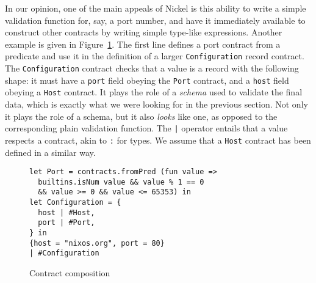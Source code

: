 \documentclass[sigplan,10pt,review,anonymous]{acmart}
\newcommand{\unsure}[2][1=]{}
\begin{document}
In our opinion, one of the main appeals of Nickel is this ability to write a
simple validation function for, say, a port number, and have it immediately
available to construct other contracts by writing simple type-like expressions.
Another example is given in Figure~\ref{fig:contract-composition}. The first
line defines a port contract from a predicate and use it in the definition of a
larger \lstinline+Configuration+ record contract. The \lstinline+Configuration+
contract checks that a value is a record with the following shape: it must have
a \lstinline+port+ field obeying the \lstinline+Port+ contract, and a
\lstinline+host+ field obeying a \lstinline+Host+ contract. It plays the role of
a \emph{schema} used to validate the final data, which is exactly what we were
looking for in the previous section. Not only it plays the role of a schema, but
it also \emph{looks} like one, as opposed to the corresponding plain validation
function. The \lstinline+|+ operator entails that a value respects a contract,
akin to \lstinline+:+ for types. We assume that a \lstinline+Host+ contract has
been defined in a similar way. \unsure{What's missing in this section is an
    example of how contracts differ from standard dynamic type checking on some
function. Namely, the quality of error messages.}

\begin{figure}
  \begin{center}
\begin{lstlisting}[language=nickel]
let Port = contracts.fromPred (fun value =>
  builtins.isNum value && value % 1 == 0
  && value >= 0 && value <= 65353) in
let Configuration = {
  host | #Host,
  port | #Port,
} in
{host = "nixos.org", port = 80}
| #Configuration
\end{lstlisting}
  \end{center}
\caption{Contract composition}
\label{fig:contract-composition}
\end{figure}
\end{document}
